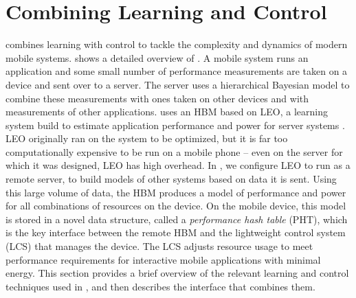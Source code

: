 \section{Combining Learning and Control}
\label{sec:framework}

\SYSTEM{} combines learning with control to tackle the complexity and
dynamics of modern mobile systems.   shows a detailed
overview of \SYSTEM{}.  A mobile system runs an application and some small number of performance measurements
are taken on a device and sent over to a server.  The server uses a
hierarchical Bayesian model to combine these measurements with ones
taken on other devices and with measurements of other applications. \SYSTEM{} uses an HBM based on LEO, a learning system build to
estimate application performance and power for server systems
\cite{LEO}.  LEO originally ran on the system to be optimized, but it
is far too computationally expensive to be run on a mobile phone --
even on the server for which it was designed, LEO has high overhead.
In \SYSTEM{}, we configure LEO to run as a remote server, to build
models of other systems based on data it is sent. Using this large volume of data, the HBM produces a model of
performance and power for all combinations of resources on the device.
On the mobile device, this model is stored in a novel data structure, called a
\emph{performance hash table} (PHT), which is the key interface
between the remote HBM and the lightweight control system (LCS) that
manages the device.  The LCS adjusts resource usage to meet
performance requirements for interactive mobile applications with
minimal energy.  %
  This section provides a
brief overview of the relevant learning and control techniques used in
\SYSTEM{}, and then describes the interface that combines them.

